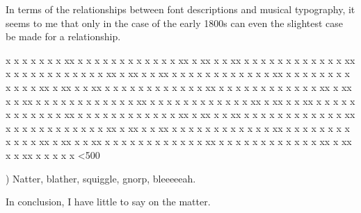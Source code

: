 \documentclass[10pt]{newlfm}
\begin{document}
\begin{newlfm}
In terms of the relationships between font descriptions and musical
typography, it seems to me that only in the case of the early 1800s can even
the slightest case be made for a relationship.  



x x x x x x x xx x x x x x x x x x x x x xx  x xx x x xx  x x x x x
x x x x x x x xx x x x x x x x x x x x x xx  x xx x x xx  x x x x x
x x x x x x x xx x x x x x x x x x x x x xx  x xx x x xx  x x x x x
x x x x x x x xx x x x x x x x x x x x x xx  x xx x x xx  x x x x x
x x x x x x x xx x x x x x x x x x x x x xx  x xx x x xx  x x x x x
x x x x x x x xx x x x x x x x x x x x x xx  x xx x x xx  x x x x x
x x x x x x x xx x x x x x x x x x x x x xx  x xx x x xx  x x x x x
x x x x x x x xx x x x x x x x x x x x x xx  x xx x x xx  x x x x x
x x x x x x x xx x x x x x x x x x x x x xx  x xx x x xx  x x x x x
\setcounter{sentcnt}{0}
\loop \ifnum\thesentcnt<500%
  \addtocounter{sentcnt}{1}%
\thesentcnt) Natter, blather, squiggle, gnorp, bleeeeeah.
    \repeat%


In conclusion, I have little to say on the matter.
\end{newlfm}
\end{document}
